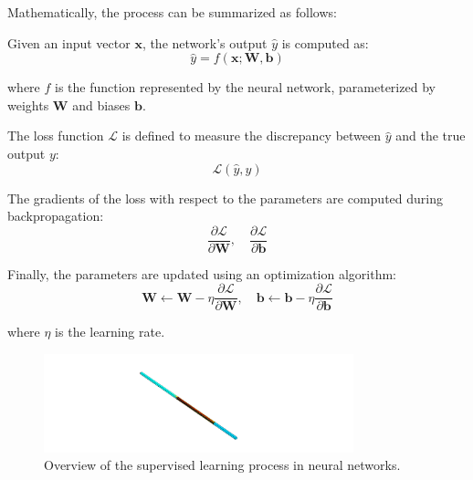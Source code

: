 \documentclass{report}
\begin{document}
        Mathematically, the process can be summarized as follows:

        Given an input vector \( \mathbf{x} \), the network's output \( \hat{y} \) is computed as:
        \begin{equation}
        \hat{y} = f(\mathbf{x}; \mathbf{W}, \mathbf{b})
        \end{equation}

        where \( f \) is the function represented by the neural network, parameterized by weights \( \mathbf{W} \) and biases \( \mathbf{b} \).

        The loss function \( \mathcal{L} \) is defined to measure the discrepancy between \( \hat{y} \) and the true output \( y \):
        \begin{equation}
        \mathcal{L}(\hat{y}, y)
        \end{equation}

        The gradients of the loss with respect to the parameters are computed during backpropagation:
        \begin{equation}
        \frac{\partial \mathcal{L}}{\partial \mathbf{W}}, \quad \frac{\partial \mathcal{L}}{\partial \mathbf{b}}
        \end{equation}

        Finally, the parameters are updated using an optimization algorithm:
        \begin{equation}
        \mathbf{W} \leftarrow \mathbf{W} - \eta \frac{\partial \mathcal{L}}{\partial \mathbf{W}}, \quad \mathbf{b} \leftarrow \mathbf{b} - \eta \frac{\partial \mathcal{L}}{\partial \mathbf{b}}
        \end{equation}

        where \( \eta \) is the learning rate.

    \begin{figure}[h]
        \centering
        \includegraphics[width=0.8\textwidth]{00_Images/00_Velocity.png}
        \caption{Overview of the supervised learning process in neural networks.}
        \label{fig:supervised_learning}
    \end{figure}
\end{document}
